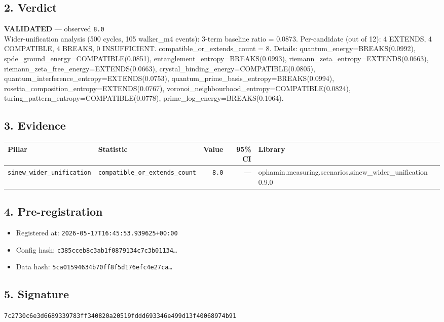 \documentclass{article}
\begin{document}
\subsection*{2. Verdict}
\textcolor{validated}{\textbf{VALIDATED}} --- observed \texttt{8.0}\\
Wider-unification analysis (500 cycles, 105 walker\_m4 events): 3-term baseline ratio = 0.0873. Per-candidate (out of 12): 4 EXTENDS, 4 COMPATIBLE, 4 BREAKS, 0 INSUFFICIENT. compatible\_or\_extends\_count = 8. Details: quantum\_energy=BREAKS(0.0992), spde\_ground\_energy=COMPATIBLE(0.0851), entanglement\_entropy=BREAKS(0.0993), riemann\_zeta\_entropy=EXTENDS(0.0663), riemann\_zeta\_free\_energy=EXTENDS(0.0663), crystal\_binding\_energy=COMPATIBLE(0.0805), quantum\_interference\_entropy=EXTENDS(0.0753), quantum\_prime\_basis\_entropy=BREAKS(0.0994), rosetta\_composition\_entropy=EXTENDS(0.0767), voronoi\_neighbourhood\_entropy=COMPATIBLE(0.0824), turing\_pattern\_entropy=COMPATIBLE(0.0778), prime\_log\_energy=BREAKS(0.1064).
\subsection*{3. Evidence}
\begin{tabular}{llrrl}\toprule
\textbf{Pillar} & \textbf{Statistic} & \textbf{Value} & \textbf{95\% CI} & \textbf{Library} \\\midrule
\texttt{sinew\_wider\_unification} & \texttt{compatible\_or\_extends\_count} & \texttt{8.0} & --- & ophamin.measuring.scenarios.sinew\_wider\_unification 0.9.0 \\
\bottomrule\end{tabular}
\subsection*{4. Pre-registration}
\begin{itemize}
\item Registered at: \texttt{2026-05-17T16:45:53.939625+00:00}
\item Config hash: \texttt{c385cceb8c3ab1f0879134c7c3b01134\dots}
\item Data hash: \texttt{5ca01594634b70ff8f5d176efc4e27ca\dots}
\end{itemize}
\subsection*{5. Signature}
\texttt{7c2730c6e3d6689339783ff340820a20519fddd693346e499d13f40068974b91}\\
\end{document}
